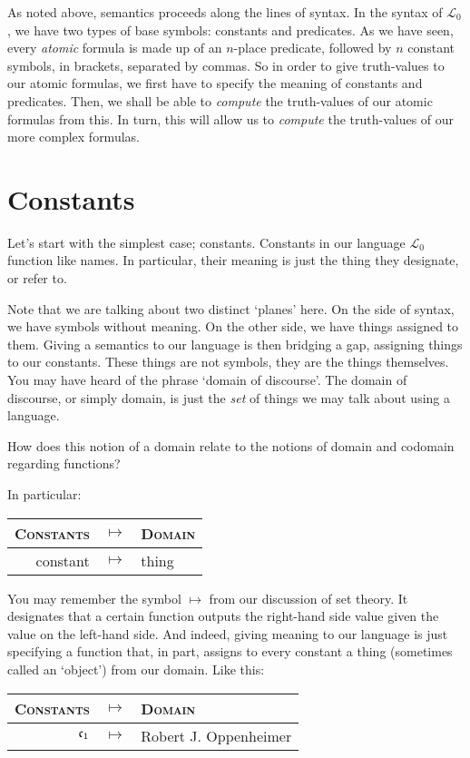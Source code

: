 As noted above, semantics proceeds along the lines of syntax. In the syntax of $\mathcal{L}_0$, we have two types of base symbols: constants and predicates. As we have seen, every \textit{atomic} formula is made up of an $n$-place predicate, followed by $n$ constant symbols, in brackets, separated by commas. So in order to give truth-values to our atomic formulas, we first have to specify the meaning of constants and predicates. Then, we shall be able to \textit{compute} the truth-values of our atomic formulas from this. In turn, this will allow us to \textit{compute} the truth-values of our more complex formulas. 

\section{Constants}

Let's start with the simplest case; constants. Constants in our language $\mathcal{L}_0$ function like names. In particular, their meaning is just the thing they designate, or refer to. 

Note that we are talking about two distinct `planes' here. On the side of syntax, we have symbols without meaning. On the other side, we have things assigned to them. Giving a semantics to our language is then bridging a gap, assigning things to our constants. These things are not symbols, they are the things themselves. You may have heard of the phrase `domain of discourse'. The domain of discourse, or simply domain, is just the \textit{set} of things we may talk about using a language.

\begin{exc}
How does this notion of a domain relate to the notions of domain and codomain regarding functions?
\end{exc}

 In particular:

\begin{center}
\begin{tabular}{rcl}
	\textsc{Constants} & $\mapsto$ & \textsc{Domain}\\\hline
	constant & $\mapsto$ & thing
\end{tabular}
\end{center}

You may remember the symbol $\mapsto$ from our discussion of set theory. It designates that a certain function outputs the right-hand side value given the value on the left-hand side. And indeed, giving meaning to our language is just specifying a function that, in part, assigns to every constant a thing (sometimes called an `object') from our domain. Like this:
\begin{center}
	\begin{tabular}{rcl}
		\textsc{Constants} & $\mapsto$ & \textsc{Domain}\\\hline
		$\mathfrak{c}_{1}$ & $\mapsto$ & Robert J. Oppenheimer
	\end{tabular}
\end{center}

